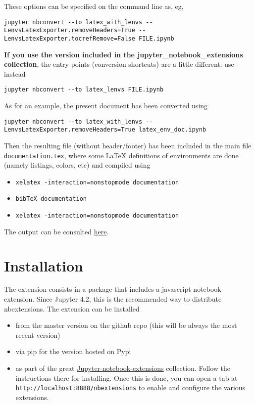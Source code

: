 These options can be specified on the command line as, eg,

\begin{verbatim}
jupyter nbconvert --to latex_with_lenvs --LenvsLatexExporter.removeHeaders=True -- LenvsLatexExporter.tocrefRemove=False FILE.ipynb
\end{verbatim}

\textbf{If you use the version included in the
jupyter\_notebook\_extensions collection}, the entry-points (conversion
shortcuts) are a little different: use instead

\begin{verbatim}
jupyter nbconvert --to latex_lenvs FILE.ipynb
\end{verbatim}

    \begin{example} As for an example, the present document has
been converted using

\begin{verbatim}
jupyter nbconvert --to latex_with_lenvs --LenvsLatexExporter.removeHeaders=True latex_env_doc.ipynb
\end{verbatim}

Then the resulting file (without header/footer) has been included in the
main file \texttt{documentation.tex}, where some LaTeX definitions of
environments are done (namely listings, colors, etc) and compiled using

\begin{itemize}
\tightlist
\item
  \texttt{xelatex\ -interaction=nonstopmode\ documentation}
\item
  \texttt{bibTeX\ documentation}
\item
  \texttt{xelatex\ -interaction=nonstopmode\ documentation}
\end{itemize}

The output can be consulted \href{documentation.pdf}{here}.\\
\end{example}

    \section{Installation}\label{installation}

    The extension consists in a package that includes a javascript notebook
extension. Since Jupyter 4.2, this is the recommended way to distribute
nbextensions. The extension can be installed

\begin{itemize}
\tightlist
\item
  from the master version on the github repo (this will be always the
  most recent version)
\item
  via pip for the version hosted on Pypi
\item
  as part of the great
  \href{https://github.com/ipython-contrib/Jupyter-notebook-extensions}{Jupyter-notebook-extensions}
  collection. Follow the instructions there for installing. Once this is
  done, you can open a tab at
  \texttt{http://localhost:8888/nbextensions} to enable and configure
  the various extensions.
\end{itemize}

